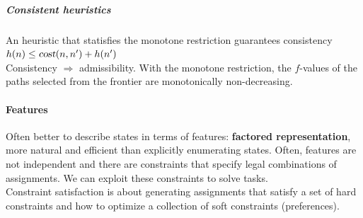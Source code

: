 \documentclass[10pt]{report}
\begin{document}
\subparagraph{Consistent heuristics} An heuristic that statisfies the monotone restriction guarantees consistency $h(n) \leq \textsl{cost}(n, n') + h(n')$\\
Consistency $\Rightarrow$ admissibility. With the monotone restriction, the $f$-values of the paths selected from the frontier are monotonically non-decreasing.
\paragraph{Features} Often better to describe states in terms of features: \textbf{factored representation}, more natural and efficient than explicitly enumerating states. Often, features are not independent and there are constraints that specify legal combinations of assignments. We can exploit these constraints to solve tasks.\\
Constraint satisfaction is about generating assignments that satisfy a set of hard constraints and how to optimize a collection of soft constraints (preferences).
\end{document}
